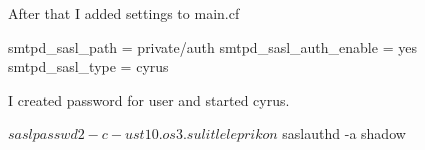 \documentclass[a4paper,11pt]{article}
\begin{document}

After that I added settings to main.cf
\begin{bashcode}
smtpd_sasl_path = private/auth
smtpd_sasl_auth_enable = yes
smtpd_sasl_type = cyrus
\end{bashcode}
I created password for user and started cyrus.
\begin{bashcode}
$ saslpasswd2 -c -u st10.os3.su litleleprikon
$ saslauthd -a shadow
\end{bashcode}
\end{document}
